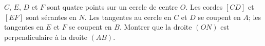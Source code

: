 \documentclass[varwidth]{standalone}
\begin{document}
    $C$, $E$, $D$ et $F$ sont quatre points sur un cercle de centre $O$. Les cordes $[CD]$ et $[EF]$ sont s\'ecantes en $N$. Les tangentes au cercle en $C$ et $D$ se coupent en $A$; les tangentes en $E$ et $F$ se coupent en $B$. Montrer que la droite $(ON)$ est perpendiculaire \`a la droite $(AB)$.
\end{document}
